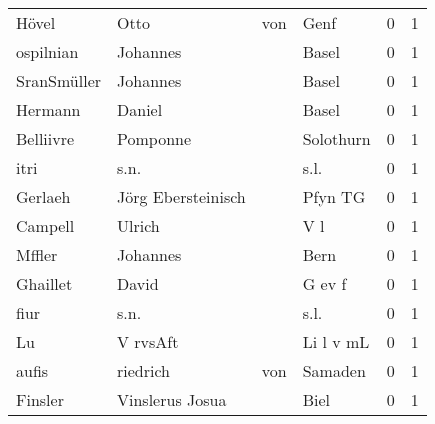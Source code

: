 \begin{tabular}{llllrr}
                    Hövel &                               Otto &         von &                                        Genf &          0 &         1 \\
                ospilnian &                           Johannes &             &                                       Basel &          0 &         1 \\
              SranSmüller &                           Johannes &             &                                       Basel &          0 &         1 \\
                  Hermann &                             Daniel &             &                                       Basel &          0 &         1 \\
                Belliivre &                           Pomponne &             &                                   Solothurn &          0 &         1 \\
                     itri &                               s.n. &             &                                        s.l. &          0 &         1 \\
                  Gerlaeh &                 Jörg Ebersteinisch &             &                                     Pfyn TG &          0 &         1 \\
                  Campell &                             Ulrich &             &                                         V l &          0 &         1 \\
                   Mffler &                           Johannes &             &                                        Bern &          0 &         1 \\
                 Ghaillet &                              David &             &                                      G ev f &          0 &         1 \\
                     fiur &                               s.n. &             &                                        s.l. &          0 &         1 \\
                       Lu &                           V rvsAft &             &                                   Li l v mL &          0 &         1 \\
                    aufis &                           riedrich &         von &                                     Samaden &          0 &         1 \\
                  Finsler &                    Vinslerus Josua &             &                                        Biel &          0 &         1 \\

\end{tabular}
